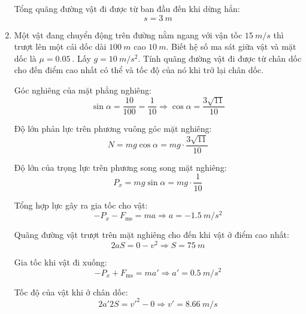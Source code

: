 \begin{enumerate}[label=\bfseries Câu \arabic*:]
{		Tổng quãng đường vật đi được từ ban đầu đến khi dừng hẳn:
		$$s=\SI{3}{m}$$
	}
	\item {}
	
	
	{Một vật đang chuyển động trên đường nằm ngang với vận tốc $\SI{15}{m/s}$ thì trượt lên một cái dốc dài $\SI{100}{m}$ cao $\SI{10}{m}$. Biết hệ số ma sát giữa vật và mặt dốc là $\mu = \SI{0.05}{}$. Lấy $g=\SI{10}{m/s^2}$. Tính quãng đường vật đi được từ chân dốc cho đến điểm cao nhất có thể và tốc độ của nó khi trở lại chân dốc.
	}
	
	\hideall
	{Góc nghiêng của mặt phẳng nghiêng:
		$$\sin \alpha = \dfrac{10}{100} = \dfrac{1}{10} \Rightarrow \cos \alpha = \dfrac{3\sqrt{11}}{10}$$
		
		Độ lớn phản lực trên phương vuông góc mặt nghiêng:
		$$N=mg \cos \alpha = mg \cdot \dfrac{3\sqrt{11}}{10}$$
		
		Độ lớn của trọng lực trên phương song song mặt nghiêng:
		$$P_x = mg \sin \alpha = mg \cdot \dfrac{1}{10}$$
		
		Tổng hợp lực gây ra gia tốc cho vật:
		$$-P_x - F_\text{ms} = ma \Rightarrow a =\SI{-1.5}{m/s^2} $$
		
		Quãng đường vật trượt trên mặt nghiêng cho đến khi vật ở điểm cao nhất:
		$$2aS = 0 -v^2 \Rightarrow S = \SI{75}{m}$$
		
		Gia tốc khi vật đi xuống:
		$$-P_x + F_\text{ms} = ma' \Rightarrow a' = \SI{0.5}{m/s^2}$$
		
		Tốc độ của vật khi ở chân dốc:
		$$2a' 2S = v'^2 - 0 \Rightarrow v' = \SI{8.66}{m/s}$$
	}
\end{enumerate}